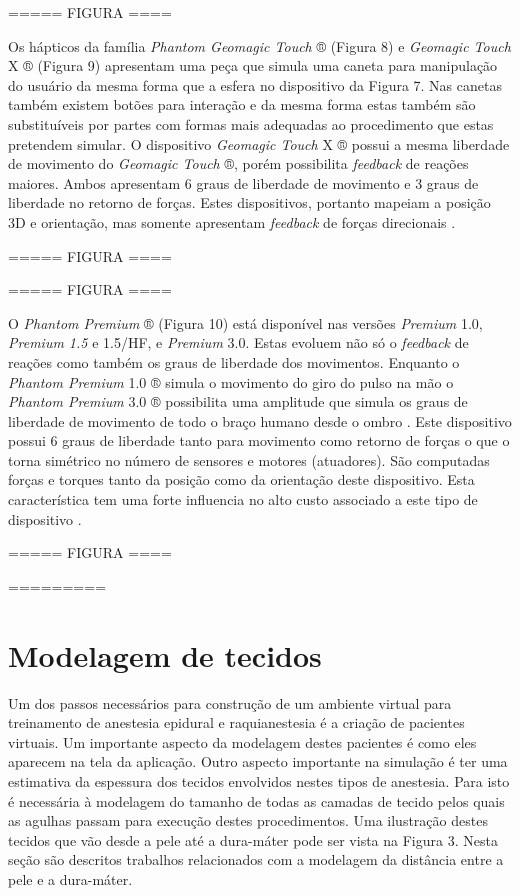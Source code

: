 ===== FIGURA ====

Os hápticos da família \textit{Phantom Geomagic Touch} ® (Figura 8) e \textit{Geomagic Touch} X ® (Figura 9) apresentam uma peça que simula uma caneta para manipulação do usuário da mesma forma que a esfera no dispositivo da Figura 7. Nas canetas também existem botões para interação e da mesma forma estas também são substituíveis por partes com formas mais adequadas ao procedimento que estas pretendem simular. O dispositivo \textit{Geomagic Touch} X ® possui a mesma liberdade de movimento do \textit{Geomagic Touch} ®, porém possibilita \textit{feedback} de reações maiores. Ambos apresentam 6 graus de liberdade de movimento e 3 graus de liberdade no retorno de forças. Estes dispositivos, portanto mapeiam a posição 3D e orientação, mas somente apresentam \textit{feedback} de forças direcionais \cite{Forsslund2013}.

===== FIGURA ====

===== FIGURA ====

O \textit{Phantom Premium} ® (Figura 10) está disponível nas versões \textit{Premium} 1.0, \textit{Premium 1.5} e 1.5/HF, e \textit{Premium} 3.0. Estas evoluem não só o \textit{feedback} de reações como também os graus de liberdade dos movimentos. Enquanto o \textit{Phantom Premium} 1.0 ® simula o movimento do giro do pulso na mão o \textit{Phantom Premium} 3.0 ® possibilita uma amplitude que simula os graus de liberdade de movimento de todo o braço humano desde o ombro \cite{3DSystems2018}. Este dispositivo possui 6 graus de liberdade tanto para movimento como retorno de forças o que o torna simétrico no número de sensores e motores (atuadores). São computadas forças e torques tanto da posição como da orientação deste dispositivo. Esta característica tem uma forte influencia no alto custo associado a este tipo de dispositivo \cite{Forsslund2013}.

===== FIGURA ====

=========

\section{Modelagem de tecidos}

Um dos passos necessários para construção de um ambiente virtual para treinamento de anestesia epidural e raquianestesia é a criação de pacientes virtuais. Um importante aspecto da modelagem destes pacientes é como eles aparecem na tela da aplicação. Outro aspecto importante na simulação é ter uma estimativa da espessura dos tecidos envolvidos nestes tipos de anestesia. Para isto é necessária à modelagem do tamanho de todas as camadas de tecido pelos quais as agulhas passam para execução destes procedimentos. Uma ilustração destes tecidos que vão desde a pele até a dura-máter pode ser vista na Figura 3. Nesta seção são descritos trabalhos relacionados com a modelagem da distância entre a pele e a dura-máter.

